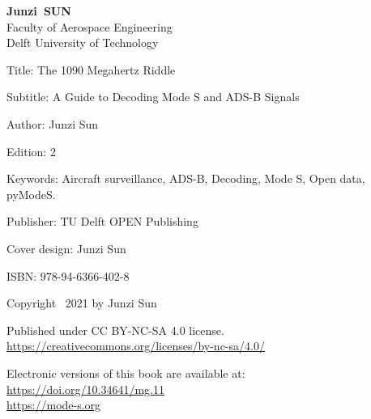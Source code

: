 \begin{titlepage}

\thispagestyle{empty}




{
    \centering
    \vspace*{2\bigskipamount}
        
    {\makeatletter
    \titlestyle\bfseries\Huge\@title
    \makeatother}

    {\makeatletter
    \ifx\@subtitle\undefined\else
        \bigskip
        \titlefont\titleshape\LARGE\@subtitle
    \fi
    \makeatother}


    \vspace*{30\bigskipamount}


    \makeatletter
    {
        \Large{\titlefont\bfseries{Junzi}\ {SUN}} \\
        \vspace*{1\bigskipamount}
        \normalsize{Faculty of Aerospace Engineering} \\
        \normalsize{Delft University of Technology} \\
    }
    \makeatother

}



\clearpage


\thispagestyle{empty}

\vspace*{16\bigskipamount}


Title: The 1090 Megahertz Riddle

\smallskip

Subtitle: A Guide to Decoding Mode S and ADS-B Signals

\smallskip

Author: Junzi Sun

\smallskip

Edition: 2

\smallskip

Keywords: Aircraft surveillance, ADS-B, Decoding, Mode S, Open data, pyModeS.

\smallskip

Publisher: TU Delft OPEN Publishing

\smallskip

Cover design: Junzi Sun

\smallskip
ISBN: 978-94-6366-402-8

\vspace{4\bigskipamount}


Copyright \textcopyright\ 2021 by Junzi Sun

\medskip

Published under CC BY-NC-SA 4.0 license.\\
\url{https://creativecommons.org/licenses/by-nc-sa/4.0/}


\medskip
\medskip
Electronic versions of this book are available at: \\
\url{https://doi.org/10.34641/mg.11}\\
\url{https://mode-s.org}

\end{titlepage}